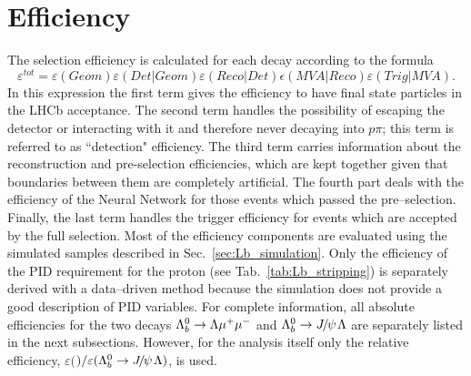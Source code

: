 \section{Efficiency}
\label{sec:Lb_eff}

The selection efficiency is calculated for each decay according to the formula
\begin{equation}
\varepsilon^{tot}=\varepsilon(Geom)\varepsilon(Det|Geom)\varepsilon(Reco|Det)\epsilon(MVA|Reco)\varepsilon(Trig|MVA).
\end{equation}
In this expression the first term gives the efficiency to have final state particles in the LHCb acceptance.
The second term handles the possibility of \Lz escaping the detector or interacting with it and therefore
never decaying into $p\pi$; this term is referred to as ``detection" efficiency.
The third term carries information about the reconstruction and pre-selection efficiencies,
which are kept together given that boundaries between them are completely artificial.
The fourth part deals with the efficiency of the Neural Network for those events which passed the pre--selection. 
Finally, the last term handles the trigger efficiency for events which are accepted by the full selection.
Most of the efficiency components are evaluated using the simulated samples described in Sec.~\ref{sec:Lb_simulation}.
Only the efficiency of the PID requirement for the proton (see Tab.~\ref{tab:Lb_stripping}) is separately derived
with a data--driven method because the simulation does not provide a good description of PID variables.
For complete information, all absolute efficiencies for the two decays $\Lambda^0_b\rightarrow\Lambda\mu^+\mu^-$ and $\Lb\to\jpsi\Lz$ are
separately listed in the next subsections. However, for the analysis itself only the relative efficiency,
$\varepsilon($\Lb\to\Lz\mumu$)/\varepsilon(\Lb\to\jpsi\Lz)$, is used. 



